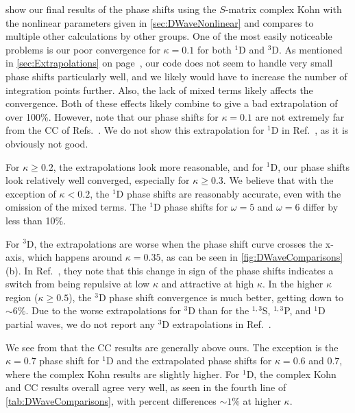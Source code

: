 \documentclass[Dissertation.tex]{subfiles}
\begin{document}
 show our final results of 
the phase shifts using the $S$-matrix complex Kohn with the nonlinear 
parameters given in \cref{sec:DWaveNonlinear} and compares to multiple other 
calculations by other groups. One of the most easily noticeable problems is
our poor convergence for $\kappa = 0.1$ for both $^1$D and $^3$D. As mentioned
in \cref{sec:Extrapolations} on page~\pageref{sec:Extrapolations}, our code
does not seem to handle very small phase shifts particularly well, and we
likely would have to increase the number of integration points further. Also, the 
lack of mixed terms likely affects the convergence. Both of these effects
likely combine to give a bad extrapolation of over 100\%. However, note that
our phase shifts for $\kappa = 0.1$ are not extremely far from the CC of
Refs.~\cite{Walters2004,Blackwood2002}. We do not show this extrapolation for
$^1$D in Ref.~\cite{Woods2015}, as it is obviously not good.

For $\kappa \geq 0.2$, the extrapolations look more reasonable, and for $^1$D,
our phase shifts look relatively well converged, especially for $\kappa \geq 0.3$.
We believe that with the exception of $\kappa < 0.2$, the $^1$D phase shifts are
reasonably accurate, even with the omission of the mixed terms. The $^1$D phase
shifts for $\omega = 5$ and $\omega = 6$ differ by less than 10\%.

For $^3$D, the extrapolations are worse when the phase shift curve crosses the
x-axis, which happens around $\kappa = 0.35$, as can be seen in
\cref{fig:DWaveComparisons}(b). In Ref.~\cite{Blackwood2002}, they note \label{DWaveSwitch} that
this change in sign of the phase shifts indicates a switch from being repulsive
at low $\kappa$ and attractive at high $\kappa$. In the higher
$\kappa$ region ($\kappa \geq 0.5$),
the $^3$D phase shift convergence is much better, getting down to $\sim\!6\%$.
Due to the worse extrapolations for $^3$D than for the $^{1,3}$S, $^{1,3}$P,
and $^1$D partial waves, we do not report any $^3$D extrapolations in
Ref.~\cite{Woods2015}.

We see from  that the CC results
\cite{Blackwood2002,Walters2004} are generally above ours. The exception is the
$\kappa = 0.7$ phase shift for $^1$D and the extrapolated phase shifts for
$\kappa = 0.6$ and $0.7$, where the complex Kohn results are slightly higher.
For $^1$D, the complex Kohn and CC \cite{Walters2004} results overall agree
very well, as seen in the fourth line of \cref{tab:DWaveComparisons}, with
percent differences $\sim\!1\%$ at higher $\kappa$.
\end{document}
